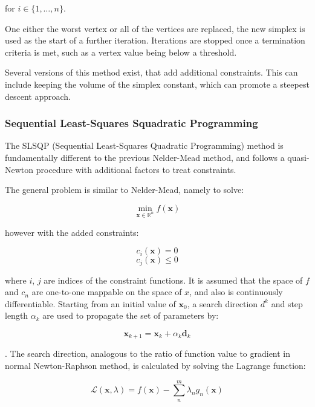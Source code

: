 for $i \in \{1, \dots, n\}$.

One either the worst vertex or all of the vertices are replaced, the new simplex
is used as the start of a further iteration. Iterations are stopped once a termination
criteria is met, such as a vertex value being below a threshold.

Several versions of this method exist, that add additional constraints. This can
include keeping the volume of the simplex constant, which can promote a steepest
descent approach.

\subsubsection{Sequential Least-Squares Squadratic Programming}
\label{subsubsec:slsqp}
The SLSQP (Sequential Least-Squares Quadratic Programming) method is fundamentally
different to the previous Nelder-Mead method, and follows a quasi-Newton procedure
with additional factors to treat constraints.

The general problem is similar to Nelder-Mead, namely to solve:

\begin{equation}
\min_{\mathbf{x} \in \mathbb{R}^n} f\left( \mathbf{x}\right)
\end{equation}

however with the added constraints:

\begin{equation}
c_i \left(\mathbf{x} \right) = 0
\end{equation}
\begin{equation}
c_j \left(\mathbf{x} \right) \leq 0
\end{equation}

where $i$, $j$ are indices of the constraint functions.
It is assumed that the space of $f$ and $c_n$ are one-to-one mappable on the
space of $x$, and also is continuously differentiable. Starting from an initial
value of $\mathbf{x}_0$, a search direction $d^k$ and step length $\alpha_k$ are
used to propagate the set of parameters by:

\begin{equation}
\mathbf{x}_{k+1} = \mathbf{x}_k + \alpha_k \mathbf{d}_k
\end{equation}

. The search direction, analogous to the ratio of function value to gradient in 
normal Newton-Raphson method, is calculated by solving the Lagrange function:

\begin{equation}
\mathcal{L} \left(\mathbf{x}, \lambda\right) = f\left(\mathbf{x}\right) - \sum^m_n \lambda_n g_n \left( \mathbf{x}\right)
\end{equation}

